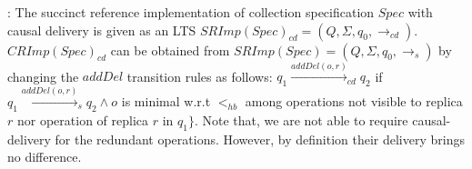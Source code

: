 : The succinct reference implementation of collection specification $Spec$ with causal delivery is given as an LTS $SRImp(Spec)_{\mathit{cd}} = (Q,\Sigma,q_0,\rightarrow_{\mathit{cd}})$. $CRImp(Spec)_{\mathit{cd}}$ can be obtained from $SRImp(Spec) = (Q,\Sigma,q_0,\rightarrow_s)$ by changing the $addDel$  transition rules as follows: $q_1 {\xrightarrow{addDel(o,r)}}_{cd} q_2$ if $q_1 {\xrightarrow{addDel(o,r)}}_s q_2 \wedge o$ is minimal w.r.t $<_{hb}$ among operations not visible to replica $r$ nor operation of replica $r$ in $q_1 \}$. Note that, we are not able to require causal-delivery for the redundant operations. However, by definition their delivery brings no difference.
























